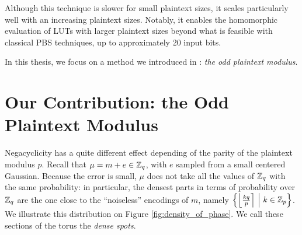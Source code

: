 Although this technique is slower for small plaintext sizes, it scales particularly well with an increasing plaintext sizes. Notably, it enables the homomorphic evaluation of LUTs with larger plaintext sizes beyond what is feasible with classical PBS techniques, up to approximately 20 input bits.


In this thesis, we focus on a method we introduced in \cite{TCHES:BonPoiRiv24}: \textit{the odd plaintext modulus}.

\section{Our Contribution: the Odd Plaintext Modulus}
\label{sec:odd_modulus}

Negacyclicity has a quite different effect depending of the parity of the plaintext modulus $p$. Recall that $\mu = m + e \in \mathbb{Z}_q$, with $e$ sampled from a small centered Gaussian. Because the error is small, $\mu$ does not take all the values of $\mathbb{Z}_q$ with the same probability: in particular, the densest parts in terms of probability over $\mathbb{Z}_q$ are the one close to the ``noiseless'' encodings of $m$, namely $\left \{ \left \lfloor \frac {k q}{p} \right \rceil ~\middle |~ k \in \mathbb{Z}_p \right \}$. We illustrate this distribution on Figure \ref{fig:density_of_phase}. We call these sections of the torus the \emph{dense spots}.


